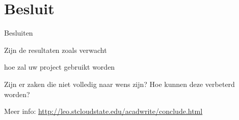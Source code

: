 \chapter{Besluit}
\label{chap_besluit}

Besluiten

Zijn de resultaten zoals verwacht

hoe zal uw project gebruikt worden

Zijn er zaken die niet volledig naar wens zijn? Hoe kunnen deze verbeterd worden?

Meer info: \url{http://leo.stcloudstate.edu/acadwrite/conclude.html}